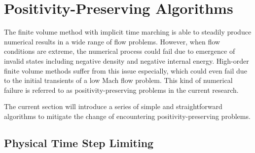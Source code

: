 \section{Positivity-Preserving Algorithms}

The finite volume method with implicit time marching
is able to steadily produce numerical results in
a wide range of flow problems.
However, when flow conditions are extreme,
the numerical process could fail due to
emergence of invalid states including
negative density and negative internal energy.
High-order finite volume methods suffer from this issue especially,
which could even fail due to the initial transients
of a low Mach flow problem.
This kind of numerical failure is referred to
as positivity-preserving problems in the current research.

The current section will introduce a series of simple
and straightforward algorithms
to mitigate the change of encountering positivity-preserving problems.

\subsection{Physical Time Step Limiting}

